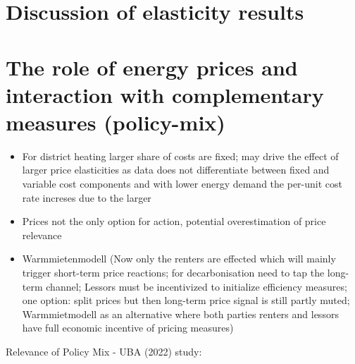 \documentclass[12pt,twoside]{reedthesis}
\begin{document}
\hypertarget{discussion-of-elasticity-results}{%
\section{Discussion of elasticity results}\label{discussion-of-elasticity-results}}

\hypertarget{the-role-of-energy-prices-and-interaction-with-complementary-measures-policy-mix}{%
\section{The role of energy prices and interaction with complementary measures (policy-mix)}\label{the-role-of-energy-prices-and-interaction-with-complementary-measures-policy-mix}}
\begin{itemize}
\item
  For district heating larger share of costs are fixed; may drive the effect of larger price elasticities as data does not differentiate between fixed and variable cost components and with lower energy demand the per-unit cost rate increses due to the larger
\item
  Prices not the only option for action, potential overestimation of price relevance
\item
  Warmmietenmodell (Now only the renters are effected which will mainly trigger short-term price reactions; for decarbonisation need to tap the long-term channel; Lessors must be incentivized to initialize efficiency measures; one option: split prices but then long-term price signal is still partly muted; Warmmietmodell as an alternative where both parties renters and lessors have full economic incentive of pricing measures)
\end{itemize}
Relevance of Policy Mix - UBA (2022) study:
\end{document}
